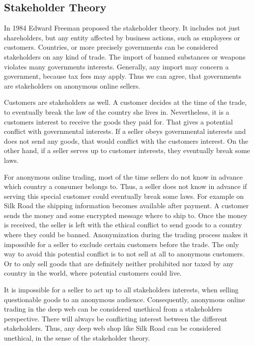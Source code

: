 \subsection{Stakeholder Theory}

In 1984 Edward Freeman proposed the stakeholder theory\cite{stakeholder}. It includes not just shareholders, but any entity affected by business actions, such as employees or customers. Countries, or more precisely governments can be considered stakeholders on any kind of trade. The import of banned substances or weapons violates many governments interests. Generally, any import may concern a government, because tax fees may apply. Thus we can agree, that governments are stakeholders on anonymous online sellers. 

Customers are stakeholders as well. A customer decides at the time of the trade, to eventually break the law of the country she lives in. Nevertheless, it is a customers interest to receive the goods they paid for. That gives a potential conflict with governmental interests. If a seller obeys governmental interests and does not send any goods, that would conflict with the customers interest. On the other hand, if a seller serves up to customer interests, they eventually break some laws.

For anonymous online trading, most of the time sellers do not know in advance which country a consumer belongs to. Thus, a seller does not know in advance if serving this special customer could eventually break some laws. For example on Silk Road the shipping information becomes available after payment. A customer sends the money and some encrypted message where to ship to\cite{silkroad2013}. Once the money is received, the seller is left with the ethical conflict to send goods to a country where they could be banned. Anonymization during the trading process makes it impossible for a seller to exclude certain customers before the trade. The only way to avoid this potential conflict is to not sell at all to anonymous customers. Or to only sell goods that are definitely neither prohibited nor taxed by any country in the world, where potential customers could live.

It is impossible for a seller to act up to all stakeholders interests, when selling questionable goods to an anonymous audience. Consequently, anonymous online trading in the deep web can be considered unethical from a stakeholders perspective. There will always be conflicting interest between the different stakeholders. Thus, any deep web shop like Silk Road can be considered unethical, in the sense of the stakeholder theory.